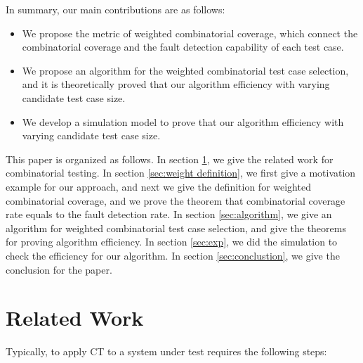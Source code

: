 \documentclass[10pt,conference, compsocconf]{IEEEtran}
\begin{document}
\begin{CJK}{UTF8}{gkai}

In summary, our main contributions are as follows:

\begin{itemize}
 \item We propose the metric of weighted combinatorial coverage, 
 which connect the combinatorial coverage and the fault detection 
 capability of each test case.
 \item We propose an algorithm for the weighted combinatorial
 test case selection, and it is theoretically proved that our algorithm
 efficiency with varying candidate test case size.   
 \item We develop a simulation model to prove that our algorithm 
 efficiency with varying candidate test case size. 
\end{itemize}
%
This paper is organized as follows. In section \ref{sec:relatework},
we give the related work for combinatorial testing.
In section \ref{sec:weight definition},
we first give a motivation example for our approach, and next 
we give the definition for weighted combinatorial coverage, 
and we prove the theorem that combinatorial coverage rate 
equals to the fault detection rate. In section \ref{sec:algorithm},
we give an algorithm for weighted combinatorial test case selection, 
and give the theorems for proving algorithm efficiency. In section \ref{sec:exp}, 
we did the simulation to check the efficiency for our algorithm. 
In section \ref{sec:conclustion}, we give the conclusion for the paper. 

\section{Related Work}
\label{sec:relatework}
Typically, to apply CT to a system under test requires the following steps:


\end{CJK}
\end{document}
